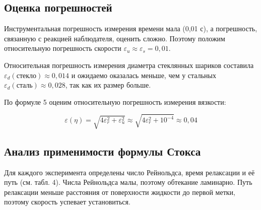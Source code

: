 \documentclass{article}
\begin{document}
	
\subsection*{Оценка погрешностей}
\hspace{4mm} Инструментальная погрешность измерения времени мала (0,01 с), а погрешность, связанную с реакцией наблюдателя, оценить сложно. Поэтому положим относительную погрешность скорости $\varepsilon_u \approx \varepsilon_s = 0,01$. 

Относительная погрешность измерения диаметра стеклянных шариков составила $\varepsilon_d(стекло) \approx 0,014$ и ожидаемо оказалась меньше, чем у стальных $\varepsilon_d(сталь) \approx 0,028$, так как их размер больше.

По формуле 5 оценим относительную погрешность измерения вязкости:

\begin{equation}
	\varepsilon(\eta) = \sqrt{4\varepsilon_r^2 + \varepsilon_u^2} \approx \sqrt{4\varepsilon_r^2 + 10^{-4}} \approx 0,04
\end{equation}	


\subsection*{Анализ применимости формулы Стокса}

\hspace{4mm} Для каждого эксперимента определены число Рейнольдса, время релаксации и её путь (см. табл. 4). Числа Рейнольдса малы, поэтому обтекание ламинарно. Путь релаксации меньше расстояния от поверхности жидкости до первой метки, поэтому скорость успевает установиться.
\end{document}
